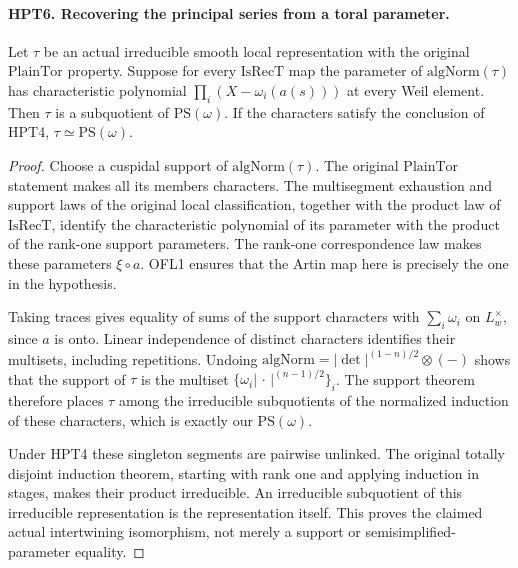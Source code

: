 \paragraph{HPT6. Recovering the principal series from a toral parameter.}
\label{claim:HPT6}
Let $\tau$ be an actual irreducible smooth local representation with
the original $\mathrm{PlainTor}$ property.  Suppose for every
$\mathrm{IsRecT}$ map the parameter of $\mathrm{algNorm}(\tau)$
has characteristic polynomial $\prod_i(X-\omega_i(a(s)))$ at
every Weil element.  Then $\tau$ is a subquotient of
$\mathrm{PS}(\omega)$.  If the characters satisfy the conclusion
of HPT4, $\tau\simeq\mathrm{PS}(\omega)$.
\begin{proof}
Choose a cuspidal support of $\mathrm{algNorm}(\tau)$.
The original $\mathrm{PlainTor}$ statement makes all its members
characters.  The multisegment exhaustion and support laws of the
original local classification, together with the product law of
$\mathrm{IsRecT}$, identify the characteristic polynomial of its
parameter with the product of the rank-one support parameters.
The rank-one correspondence law makes these parameters
$\xi\circ a$.  OFL1 ensures that the Artin map here is precisely
the one in the hypothesis.

Taking traces gives equality of sums of the support characters
with $\sum_i\omega_i$ on $L_w^\times$, since $a$ is onto.
Linear independence of distinct characters identifies their
multisets, including repetitions.  Undoing
$\mathrm{algNorm}=|\det|^{(1-n)/2}\otimes(-)$ shows that the
support of $\tau$ is the multiset
$\{\omega_i|\,\cdot\,|^{(n-1)/2}\}_i$.  The support theorem
therefore places $\tau$ among the irreducible subquotients of
the normalized induction of these characters, which is exactly
our $\mathrm{PS}(\omega)$.

Under HPT4 these singleton segments are pairwise unlinked.
The original totally disjoint induction theorem, starting with
rank one and applying induction in stages, makes their product
irreducible.  An irreducible subquotient of this irreducible
representation is the representation itself.  This proves the
claimed actual intertwining isomorphism, not merely a support
or semisimplified-parameter equality.
\end{proof}

